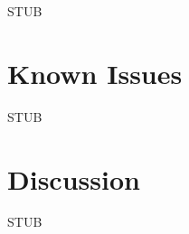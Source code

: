 \documentclass[11pt, onecolumn]{article}
\begin{document}
STUB


\section{Known Issues}

STUB


\section{Discussion}

STUB
\end{document}
